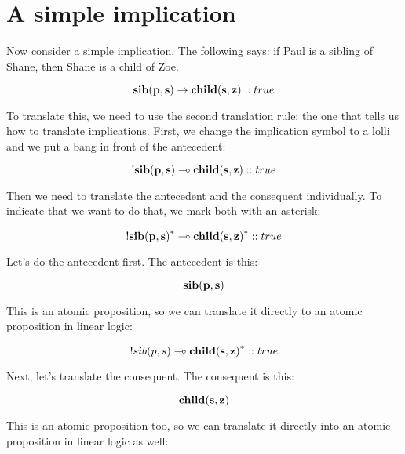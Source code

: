 \documentclass[../../../main.tex]{subfiles}
\begin{document}
\section{A simple implication}

Now consider a simple implication. The following says: if Paul is a sibling of Shane, then Shane is a child of Zoe. 

\begin{equation*}
  \nd{sib(p, s) \impl/ child(s, z)} :: true
\end{equation*}

\noindent
To translate this, we need to use the second translation rule: the one that tells us how to translate implications. First, we change the implication symbol to a lolli and we put a bang in front of the antecedent:

\begin{equation*}
  \nd{\bang/sib(p, s) \lolli/ child(s, z)} :: true
\end{equation*}

\noindent
Then we need to translate the antecedent and the consequent individually. To indicate that we want to do that, we mark both with an asterisk:

\begin{equation*}
  \nd{\bang/sib(p, s)}^{*} \lolli/ \nd{child(s, z)}^{*} :: true
\end{equation*}

\noindent
Let's do the antecedent first. The antecedent is this:

\begin{equation*}
  \mathbf{sib(p, s)}
\end{equation*}

\noindent
This is an atomic proposition, so we can translate it directly to an atomic proposition in linear logic:

\begin{equation*}
  \bang/sib(p, s) \lolli/ \nd{child(s, z)}^{*} :: true
\end{equation*}

\noindent
Next, let's translate the consequent. The consequent is this:

\begin{equation*}
  \mathbf{child(s, z)}
\end{equation*}

\noindent
This is an atomic proposition too, so we can translate it directly into an atomic proposition in linear logic as well:
\end{document}
